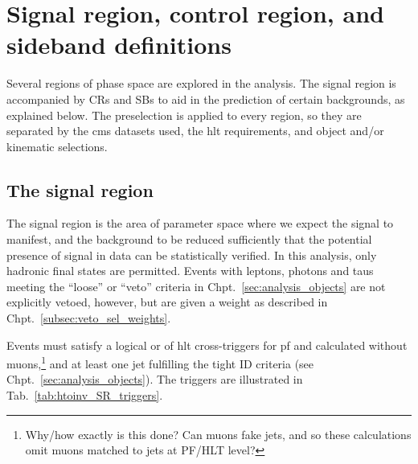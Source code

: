 \section{Signal region, control region, and sideband definitions}
\label{sec:region_definitions}

Several regions of phase space are explored in the analysis. The signal region is accompanied by \glspl{CR} and \glspl{SB} to aid in the prediction of certain backgrounds, as explained below. The preselection is applied to every region, so they are separated by the \acrshort{cms} datasets used, the \acrlong{hlt} requirements, and object and/or kinematic selections.





\subsection{The signal region}
\label{subsec:htoinv_signal_region}

The signal region is the area of parameter space where we expect the signal to manifest, and the background to be reduced sufficiently that the potential presence of signal in data can be statistically verified. In this analysis, only hadronic final states are permitted. Events with leptons, photons and taus meeting the ``loose'' or ``veto'' criteria in Chpt.~\ref{sec:analysis_objects} are not explicitly vetoed, however, but are given a weight as described in Chpt.~\ref{subsec:veto_sel_weights}.

Events must satisfy a logical or of \acrshort{hlt} cross-triggers for \acrlong{pf} \ptmiss and \mht calculated without muons,\footnote{Why/how exactly is this done? Can muons fake jets, and so these calculations omit muons matched to jets at PF/HLT level?} and at least one \gls{jet} fulfilling the tight ID criteria (see Chpt.~\ref{sec:analysis_objects}). The triggers are illustrated in Tab.~\ref{tab:htoinv_SR_triggers}.


